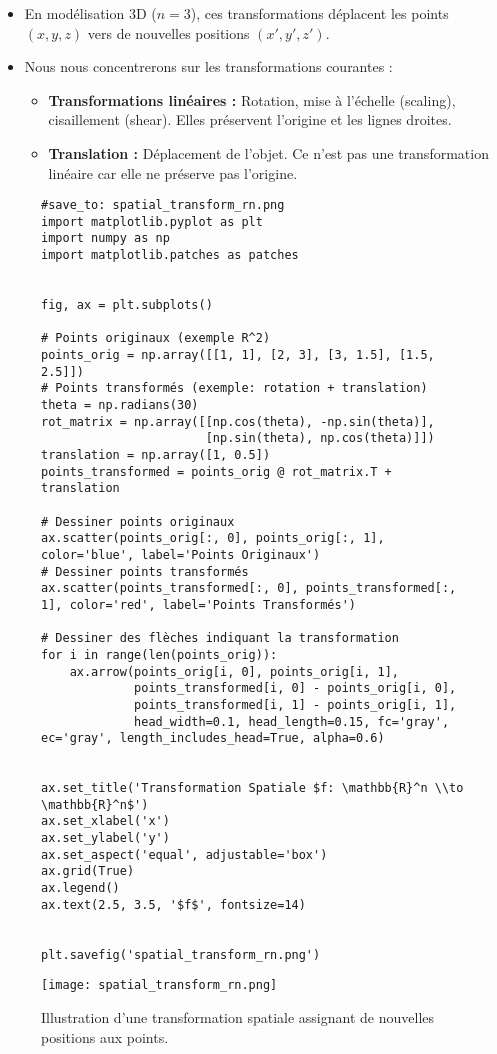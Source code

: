 \documentclass{article}
\begin{document}
\begin{itemize}
    \item En modélisation 3D ($n=3$), ces transformations déplacent les points $(x, y, z)$ vers de nouvelles positions $(x', y', z')$.
    \item Nous nous concentrerons sur les transformations courantes :
        \begin{itemize}
            \item \textbf{Transformations linéaires :} Rotation, mise à l'échelle (scaling), cisaillement (shear). Elles préservent l'origine et les lignes droites.
            \item \textbf{Translation :} Déplacement de l'objet. Ce n'est pas une transformation linéaire car elle ne préserve pas l'origine.
        \end{itemize}
\end{itemize}
\begin{figure}[H]
    \centering
    \begin{verbatim}
#save_to: spatial_transform_rn.png
import matplotlib.pyplot as plt
import numpy as np
import matplotlib.patches as patches


fig, ax = plt.subplots()

# Points originaux (exemple R^2)
points_orig = np.array([[1, 1], [2, 3], [3, 1.5], [1.5, 2.5]])
# Points transformés (exemple: rotation + translation)
theta = np.radians(30)
rot_matrix = np.array([[np.cos(theta), -np.sin(theta)],
                       [np.sin(theta), np.cos(theta)]])
translation = np.array([1, 0.5])
points_transformed = points_orig @ rot_matrix.T + translation

# Dessiner points originaux
ax.scatter(points_orig[:, 0], points_orig[:, 1], color='blue', label='Points Originaux')
# Dessiner points transformés
ax.scatter(points_transformed[:, 0], points_transformed[:, 1], color='red', label='Points Transformés')

# Dessiner des flèches indiquant la transformation
for i in range(len(points_orig)):
    ax.arrow(points_orig[i, 0], points_orig[i, 1],
             points_transformed[i, 0] - points_orig[i, 0],
             points_transformed[i, 1] - points_orig[i, 1],
             head_width=0.1, head_length=0.15, fc='gray', ec='gray', length_includes_head=True, alpha=0.6)


ax.set_title('Transformation Spatiale $f: \mathbb{R}^n \\to \mathbb{R}^n$')
ax.set_xlabel('x')
ax.set_ylabel('y')
ax.set_aspect('equal', adjustable='box')
ax.grid(True)
ax.legend()
ax.text(2.5, 3.5, '$f$', fontsize=14)


plt.savefig('spatial_transform_rn.png')

    \end{verbatim}
    \texttt{[image: spatial\_transform\_rn.png]}
    \caption{Illustration d'une transformation spatiale assignant de nouvelles positions aux points.}
    \label{fig:spatial_transform_rn}
\end{figure}
\end{document}

